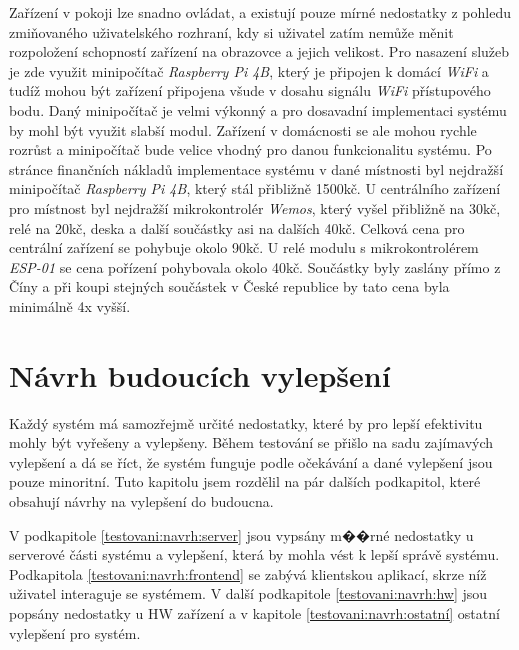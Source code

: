 Zařízení v pokoji lze snadno ovládat, a existují pouze mírné nedostatky z pohledu zmiňovaného uživatelského rozhraní, kdy si uživatel zatím nemůže měnit rozpoložení schopností zařízení na obrazovce a jejich velikost.
Pro nasazení služeb je zde využit minipočítač \emph{Raspberry Pi 4B}, který je připojen k domácí \emph{WiFi} a tudíž mohou být zařízení připojena všude v dosahu signálu \emph{WiFi} přístupového bodu.
Daný minipočítač je velmi výkonný a pro dosavadní implementaci systému by mohl být využit slabší modul.
Zařízení v domácnosti se ale mohou rychle rozrůst a minipočítač bude velice vhodný pro danou funkcionalitu systému.
\newpage
Po stránce finančních nákladů implementace systému v dané místnosti byl nejdražší minipočítač \emph{Raspberry Pi 4B}, který stál přibližně 1500kč.
U centrálního zařízení pro místnost byl nejdražší mikrokontrolér \emph{Wemos}, který vyšel přibližně na 30kč, relé na 20kč, deska a další součástky asi na dalších 40kč.
Celková cena pro centrální zařízení se pohybuje okolo 90kč.
U relé modulu s mikrokontrolérem \emph{ESP-01} se cena pořízení pohybovala okolo 40kč.
Součástky byly zaslány přímo z Číny a při koupi stejných součástek v České republice by tato cena byla minimálně 4x vyšší.

\section{Návrh budoucích vylepšení}
\label{testovani:praxe}
Každý systém má samozřejmě určité nedostatky, které by pro lepší efektivitu mohly být vyřešeny a vylepšeny.
Během testování se přišlo na sadu zajímavých vylepšení a dá se říct, že systém funguje podle očekávání a dané vylepšení jsou pouze minoritní.
Tuto kapitolu jsem rozdělil na pár dalších podkapitol, které obsahují návrhy na vylepšení do budoucna.

V podkapitole \ref{testovani:navrh:server} jsou vypsány m��rné nedostatky u serverové části systému a vylepšení, která by mohla vést k lepší správě systému.
Podkapitola \ref{testovani:navrh:frontend} se zabývá klientskou aplikací, skrze níž uživatel interaguje se systémem.
V další podkapitole \ref{testovani:navrh:hw} jsou popsány nedostatky u HW zařízení a v kapitole \ref{testovani:navrh:ostatní} ostatní vylepšení pro systém.


